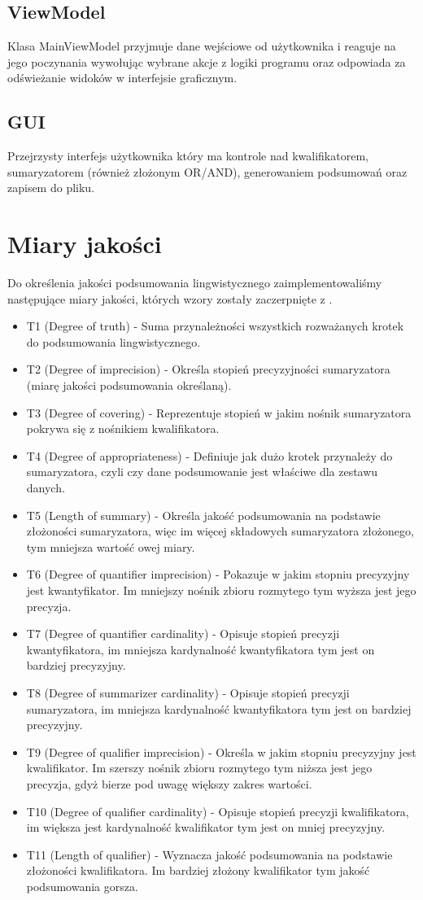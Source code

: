 \documentclass{classrep}
\begin{document}
\subsection{ViewModel}
Klasa MainViewModel przyjmuje dane wejściowe od użytkownika i reaguje na jego poczynania wywołując wybrane akcje z logiki programu oraz odpowiada za odświeżanie widoków w interfejsie graficznym.
\subsection{GUI}
Przejrzysty interfejs użytkownika który ma kontrole nad kwalifikatorem, sumaryzatorem (również złożonym OR/AND), generowaniem podsumowań oraz zapisem do pliku.

\section{Miary jakości}
Do określenia jakości podsumowania lingwistycznego zaimplementowaliśmy następujące miary jakości, których wzory zostały zaczerpnięte z \cite{adam}.
\begin{itemize}
    \item T1 (Degree of truth) - Suma przynależności wszystkich rozważanych krotek do podsumowania lingwistycznego.
    \item T2 (Degree of imprecision) - Określa stopień precyzyjności sumaryzatora (miarę jakości podsumowania określaną).
    \item T3 (Degree of covering) - Reprezentuje stopień w jakim nośnik sumaryzatora pokrywa się z nośnikiem kwalifikatora.
    \item T4 (Degree of appropriateness) - Definiuje jak dużo krotek przynależy do sumaryzatora, czyli czy dane podsumowanie jest właściwe dla zestawu danych.
    \item T5 (Length of summary) - Określa jakość podsumowania na podstawie złożoności sumaryzatora, więc im więcej składowych sumaryzatora złożonego, tym mniejsza wartość owej miary.
    \item T6 (Degree of quantifier imprecision) - Pokazuje w jakim stopniu precyzyjny jest kwantyfikator. Im mniejszy nośnik zbioru rozmytego tym wyższa jest jego precyzja.
    \item T7 (Degree of quantifier cardinality) - Opisuje stopień precyzji kwantyfikatora, im mniejsza kardynalność kwantyfikatora tym jest on bardziej precyzyjny.
    \item T8 (Degree of summarizer cardinality) - Opisuje stopień precyzji sumaryzatora, im mniejsza kardynalność kwantyfikatora tym jest on bardziej precyzyjny.
    \item T9 (Degree of qualifier imprecision) - Określa w jakim stopniu precyzyjny jest kwalifikator. Im szerszy nośnik zbioru rozmytego tym niższa jest jego precyzja, gdyż bierze pod uwagę większy zakres wartości.
    \item T10 (Degree of qualifier cardinality) - Opisuje stopień precyzji kwalifikatora, im większa jest kardynalność kwalifikator tym jest on mniej precyzyjny.
    \item T11 (Length of qualifier) - Wyznacza jakość podsumowania na podstawie złożoności kwalifikatora. Im bardziej złożony kwalifikator tym jakość podsumowania gorsza.
\end{itemize}
\end{document}
